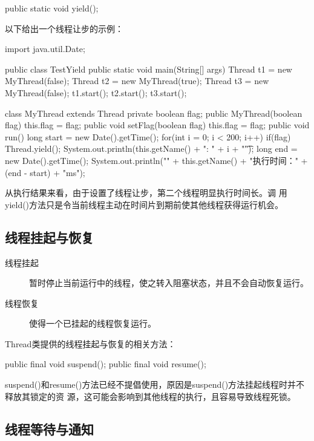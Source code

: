 \begin{javaCode}
public static void yield();
\end{javaCode}

以下给出一个线程让步的示例：


\begin{javaCode}
import java.util.Date;

public class TestYield {
  public static void main(String[] args) {
    Thread t1 = new MyThread(false);
    Thread t2 = new MyThread(true);
    Thread t3 = new MyThread(false);
    t1.start();
    t2.start();
    t3.start();
  }
}

class MyThread extends Thread {
  private boolean flag;
  public MyThread(boolean flag) {
    this.flag = flag;
  }
  public void setFlag(boolean flag) {
    this.flag = flag;
  }
  public void run() {
    long start = new Date().getTime();
    for(int i = 0; i < 200; i++) {
      if(flag) {
        Thread.yield();
      }
      System.out.println(this.getName() + ": " + i + "\t");
    }
    long end = new Date().getTime();
    System.out.println("\n" + this.getName() + "执行时间：" + (end - start) + "ms");
  }
}
\end{javaCode}

从执行结果来看，由于设置了线程让步，第二个线程明显执行时间长。调
用yield()方法只是令当前线程主动在时间片到期前使其他线程获得运行机会。

\subsection{线程挂起与恢复}

\begin{description}
\item[线程挂起] 暂时停止当前运行中的线程，使之转入阻塞状态，并且不会自动恢复运行。
\item[线程恢复] 使得一个已挂起的线程恢复运行。
\end{description}

Thread类提供的线程挂起与恢复的相关方法：

\begin{javaCode}
public final void suspend();
public final void resume();
\end{javaCode}

suspend()和resume()方法已经不提倡使用，原因是suspend()方法挂起线程时并不释放其锁定的资
源，这可能会影响到其他线程的执行，且容易导致线程死锁。

\subsection{线程等待与通知}

